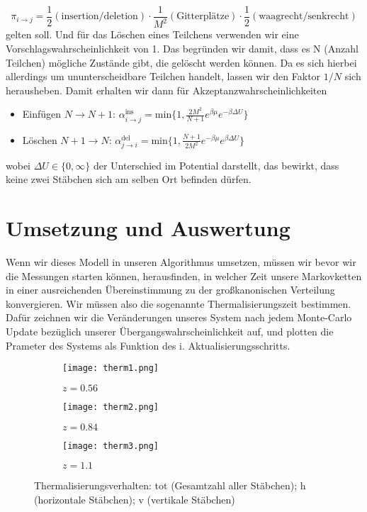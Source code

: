 \documentclass[12pt]{article}
\begin{document}
$$\pi_{i\rightarrow{j}}=\frac{1}{2}(\text{insertion/deletion})\cdot\frac{1}{M^2}(\text{Gitterplätze})\cdot\frac{1}{2}(\text{waagrecht/senkrecht})$$
gelten soll. Und für das Löschen eines Teilchens verwenden wir eine Vorschlagswahrscheinlichkeit von 1. Das begründen wir damit, dass es N (Anzahl Teilchen) mögliche Zustände gibt, die gelöscht werden können. Da es sich hierbei allerdings um ununterscheidbare Teilchen handelt, lassen wir den Faktor $1/N$ sich herausheben.
Damit erhalten wir dann für Akzeptanzwahrscheinlichkeiten
\begin{itemize}
    \item Einfügen $N\rightarrow{N+1}$: $\alpha^\text{ins}_{i\rightarrow{j}}= \text{min}\Big\{1,\frac{2M^2}{{N+1}}e^{\beta\mu}e^{-\beta\Delta{U}}\Big\}$
    \item Löschen $N+1\rightarrow{N}$: $\alpha^\text{del}_{j\rightarrow{i}}= \text{min}\Big\{1,\frac{{N+1}}{2M^2}e^{-\beta\mu}e^{\beta\Delta{U}}\Big\}$
\end{itemize}
wobei $\Delta{U}\in\{0,\infty\}$ der Unterschied im Potential darstellt, das bewirkt, dass keine zwei Stäbchen sich am selben Ort befinden dürfen.




\section*{Umsetzung und Auswertung}
Wenn wir dieses Modell in unseren Algorithmus umsetzen, müssen wir bevor wir die Messungen starten können, herausfinden, in welcher Zeit unsere Markovketten in einer ausreichenden Übereinstimmung zu der großkanonischen Verteilung konvergieren. Wir müssen also die sogenannte Thermalisierungszeit bestimmen. Dafür zeichnen wir die Veränderungen unseres System nach jedem Monte-Carlo Update bezüglich unserer Übergangswahrscheinlichkeit auf, und plotten die Prameter des Systems als Funktion des i. Aktualisierungsschritts.
\begin{figure}[H]\hspace*{-1.5cm}
    \begin{subfigure}{0.4\textwidth}
    \texttt{[image: therm1.png]}
    \caption{$z=0.56$}
    \end{subfigure}
    \hfill
    \begin{subfigure}{0.4\textwidth}
    \hspace*{-0.8cm}
    \texttt{[image: therm2.png]}
    \caption{$z=0.84$}
    \end{subfigure}
    \hfill
    \hspace*{-1.5cm}
    \begin{subfigure}{0.4\textwidth}
    \texttt{[image: therm3.png]}
    \caption{$z=1.1$}
    \end{subfigure}
    \hfill
    \caption{Thermalisierungsverhalten: tot (Gesamtzahl aller Stäbchen); h (horizontale Stäbchen); v (vertikale Stäbchen) }
    \end{figure}
\end{document}
